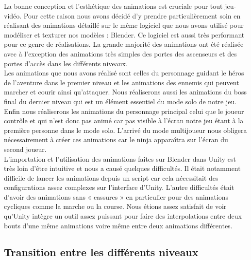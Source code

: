 \documentclass[12pt]{article}
\begin{document}
La bonne conception et l’esthétique des animations est cruciale pour tout jeu-vidéo. Pour cette raison nous avons décidé d’y prendre particulièrement soin en réalisant des animations détaillé sur le même logiciel que nous avons utilisé pour modéliser et texturer nos modèles : Blender. Ce logiciel est aussi très performant pour ce genre de réalisations. La grande majorité des animations ont été réalisée avec à l’exception des animations très simples des portes des ascenseurs et des portes d’accès dans les différents niveaux.\\
Les animations que nous avons réalisé sont celles du personnage guidant le héros de l’aventure dans le premier niveau et les animations des ennemis qui peuvent marcher et courir ainsi qu’attaquer. Nous réaliserons aussi les animations du boss final du dernier niveau qui est un élément essentiel du mode solo de notre jeu. Enfin nous réaliserons les animations du personnage principal celui que le joueur contrôle et qui n’est donc pas animé car pas visible à l’écran notre jeu étant à la première personne dans le mode solo. L’arrivé du mode multijoueur nous obligera nécessairement à créer ces animations car le ninja apparaîtra sur l’écran du second joueur.\\
L’importation et l’utilisation des animations faites sur Blender dans Unity est très loin d’être intuitive et nous a causé quelques difficultés. Il était notamment difficile de lancer les animations depuis un script car cela nécessitait des configurations assez complexes sur l’interface d’Unity. L’autre difficultés était d’avoir des animations sans « cassures » en particulier pour des animations cycliques comme la marche ou la course. Nous étions assez satisfait de voir qu’Unity intègre un outil assez puissant pour faire des interpolations entre deux bouts d’une même animations voire même entre deux animations différentes.


\subsection{Transition entre les différents niveaux}
\end{document}
